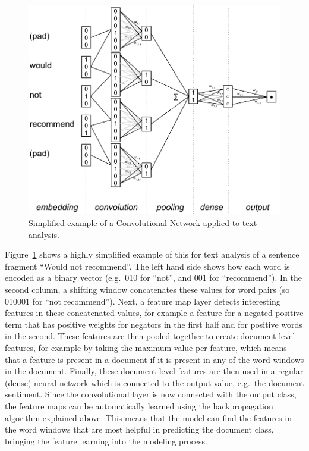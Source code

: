 {%


\begin{figure}
  \centering\includegraphics[width=.8\linewidth]{figures/ch09_cnn_cropped.pdf}
  \caption{Simplified example of a Convolutional Network applied to text analysis.}
  \label{fig:cnn}
  \end{figure}

Figure~\ref{fig:cnn} shows a highly simplified example of this for text analysis of a sentence fragment ``Would not recommend''.
The left hand side shows how each word is encoded as a binary vector (e.g.\ 010 for ``not'', and 001 for ``recommend'').
In the second column, a shifting window concatenates these values for word pairs (so 010001 for ``not recommend'').
Next, a feature map layer detects interesting features in these concatenated values, for example
a feature for a negated positive term that has positive weights for negators in the first half and for positive words in the second.
These features are then pooled together to create document-level features,
for example by taking the maximum value per feature, which means that a feature is present in a document if it is present in any of the word windows in the document.
Finally, these document-level features are then used in a regular (dense) neural network which is connected to the output value, e.g.\ the document sentiment.
Since the convolutional layer is now connected with the output class, the feature maps can be automatically learned using the backpropagation algorithm explained above.
This means that the model can find the features in the word windows that are most helpful in predicting the document class, bringing the feature learning into the modeling process.

}
